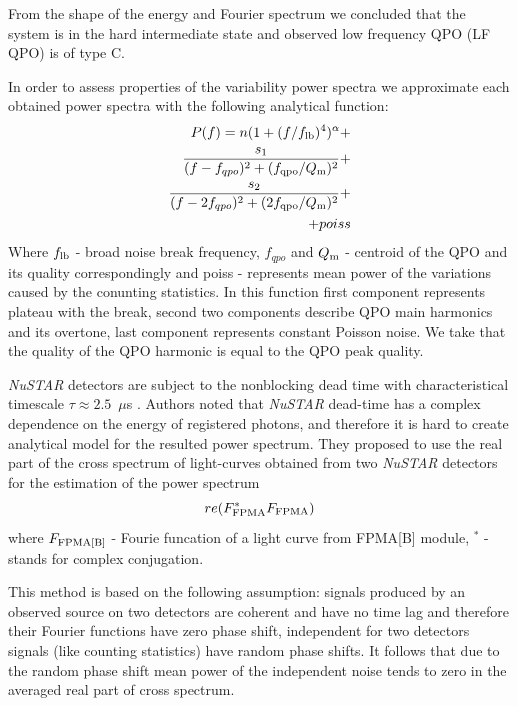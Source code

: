 \documentclass[a4paper,fleqn,usenatbib]{mnras}
\begin{document}
From the shape of the energy and Fourier spectrum we concluded that the system is in the hard intermediate state and observed low frequency QPO (LF QPO) is of type C. 

In order to assess properties of the variability power spectra we approximate each obtained power spectra with the following analytical function:
\begin{equation}
        \begin{split}
        P(f) = n (1 + (f/f_{\rm lb})^4)^{\alpha} + \\
        \frac{s_1}{(f - f_{qpo})^2 + (f_{\rm qpo}/Q_{\rm m})^2} +\\
        \frac{s_2}{(f - 2f_{qpo})^2 + (2f_{\rm qpo}/Q_{\rm m})^2} + \\
        + poiss
\end{split}
        \label{eq:complex_fit}
\end{equation}
Where $f_{\rm lb}$ - broad noise break frequency, $f_{qpo}$ and $Q_{\rm m}$ - centroid of the QPO and its quality correspondingly and poiss - represents mean power of the variations caused by the conunting statistics.
In this function first component represents plateau with the break, second two components describe QPO main harmonics and its overtone, last component represents constant Poisson noise.
We take that the quality of the QPO harmonic is equal to the QPO peak quality.

{\it NuSTAR} detectors are subject to the nonblocking dead time with characteristical timescale $\tau \approx 2.5$~$\mu$s \cite{2015ApJ...800..109B}.
Authors noted that {\it NuSTAR} dead-time has a complex dependence on the energy of registered photons, and therefore it is hard to create analytical model for the resulted power spectrum. 
They proposed to use the real part of the cross spectrum of light-curves obtained from two {\it NuSTAR} detectors for the estimation of the power spectrum 
\begin{equation}
        re(F_{\rm FPMA}^{*}F_{\rm FPMA})
\end{equation}
where $F_{\rm FPMA[B]}$ - Fourie funcation of a light curve from FPMA[B] module, $^{*}$ - stands for complex conjugation. 

This method is based on the following assumption: signals produced by an observed source on two detectors are coherent and have no time lag and therefore their Fourier functions have zero phase shift, independent for two detectors signals (like counting statistics) have random phase shifts.  
It follows that due to the random phase shift mean power of the independent noise tends to zero in the averaged real part of cross spectrum.
\end{document}
